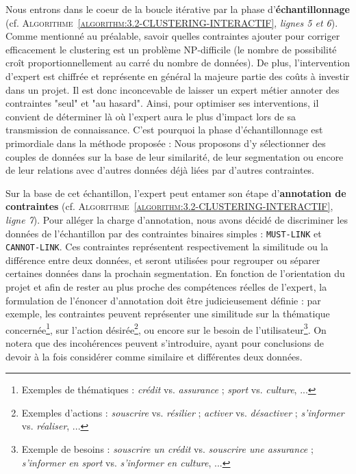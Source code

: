		Nous entrons dans le coeur de la boucle itérative par la phase d'\textbf{échantillonnage} (cf. \textsc{Algorithme~\ref{algorithm:3.2-CLUSTERING-INTERACTIF}}, \textit{lignes 5 et 6}).
		Comme mentionné au préalable, savoir quelles contraintes ajouter pour corriger efficacement le clustering est un problème NP-difficile (le nombre de possibilité croît proportionnellement au carré du nombre de données).
		De plus, l'intervention d'expert est chiffrée et représente en général la majeure partie des coûts à investir dans un projet.
		Il est donc inconcevable de laisser un expert métier annoter des contraintes "seul" et "au hasard".
		Ainsi, pour optimiser ses interventions, il convient de déterminer là où l'expert aura le plus d'impact lors de sa transmission de connaissance.
		C'est pourquoi la phase d'échantillonnage est primordiale dans la méthode proposée : Nous proposons d'y sélectionner des couples de données sur la base de leur similarité, de leur segmentation ou encore de leur relations avec d'autres données déjà liées par d'autres contraintes.
		
		Sur la base de cet échantillon, l'expert peut entamer son étape d'\textbf{annotation de contraintes} (cf. \textsc{Algorithme~\ref{algorithm:3.2-CLUSTERING-INTERACTIF}}, \textit{ligne 7}).
		Pour alléger la charge d'annotation, nous avons décidé de discriminer les données de l'échantillon par des contraintes binaires simples : \texttt{MUST-LINK} et \texttt{CANNOT-LINK}. Ces contraintes représentent respectivement la similitude ou la différence entre deux données, et seront utilisées pour regrouper ou séparer certaines données dans la prochain segmentation.
		En fonction de l'orientation du projet et afin de rester au plus proche des compétences réelles de l'expert, la formulation de l'énoncer d'annotation doit être judicieusement définie : par exemple, les contraintes peuvent représenter une similitude
		sur la thématique concernée\footnote{Exemples de thématiques : \textit{crédit} vs. \textit{assurance} ; \textit{sport} vs. \textit{culture}, ...},
		sur l'action désirée\footnote{Exemples d'actions : \textit{souscrire} vs. \textit{résilier} ; \textit{activer} vs. \textit{désactiver} ; \textit{s'informer} vs. \textit{réaliser}, ...},
		ou encore sur le besoin de l'utilisateur\footnote{Exemple de besoins : \textit{souscrire un crédit} vs. \textit{souscrire une assurance} ; \textit{s'informer en sport} vs. \textit{s'informer en culture}, ...}.
		On notera que des incohérences peuvent s'introduire, ayant pour conclusions de devoir à la fois considérer comme similaire et différentes deux données.
		
